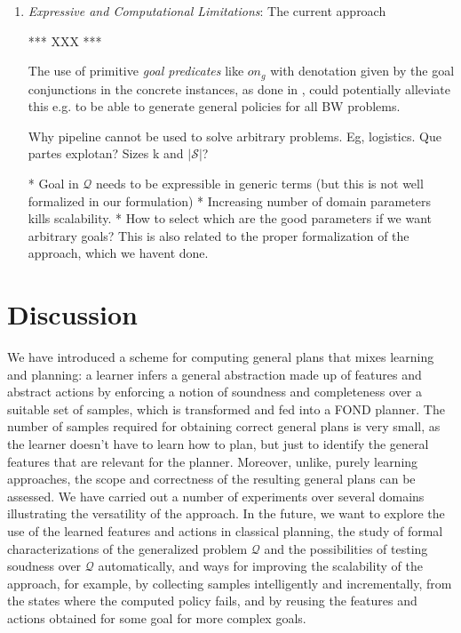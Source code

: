 \documentclass[letterpaper]{article} %
\newcommand{\Omit}[1]{}
\newcommand{\abs}[1]{\ensuremath{\left\vert{#1}\right\vert}}
\newcommand{\Q}{\mathcal{Q}}
\begin{document}
\begin{enumerate}
\item
\emph{Expressive and Computational Limitations}:
The current approach 

*** XXX ***

The use of primitive \emph{goal predicates} like $on_g$ with denotation
given by the goal conjunctions in the concrete instances, as done in 
\cite{martin-geffner:generalized}, could potentially alleviate this
e.g. to be able to generate general policies for all BW problems.


Why pipeline cannot be used to solve arbitrary problems. Eg, logistics.
Que partes explotan? Sizes k and $\abs{\mathcal{S}}$? 

* Goal in $\Q$ needs to be expressible in generic terms (but this is not well formalized in our formulation)
* Increasing number of domain parameters kills scalability.
* How to select which are the good parameters if we want arbitrary goals? This is also related to the proper formalization
  of the approach, which we havent done. 
  


\end{enumerate}


\section{Discussion}

We have introduced a scheme for computing general plans that mixes learning and planning: a learner infers
a general abstraction made up of features and abstract actions by enforcing  a notion of soundness and completeness
over a suitable set of samples, which is transformed and fed into a FOND planner.
The number of samples required for obtaining correct general plans is very small,
as the learner doesn't have to learn how to plan,  but just to identify the
general features that are relevant for the planner. Moreover, unlike, purely
learning approaches, the scope and correctness of the resulting general plans
can be assessed.  We have carried out a number of experiments over several
domains illustrating the versatility of the approach. In the future, we
want to explore the use of the learned  features and actions
in classical planning, the study of  formal characterizations
of the generalized problem $\Q$ and  the possibilities
of testing soudness over $\Q$ automatically, and ways
for improving the scalability of the approach, for example,
by collecting samples intelligently and incrementally,
from the states where the computed  policy fails,
and by reusing the features and actions obtained
for some goal for more complex goals.

\Omit{


** discussion  of experiments; things we do well and not, scope, lessons. limitations (expressive? scalability?)

** briefly related work, expanding paragraph in intro.

** summary and cconlusions
}



\end{document}
